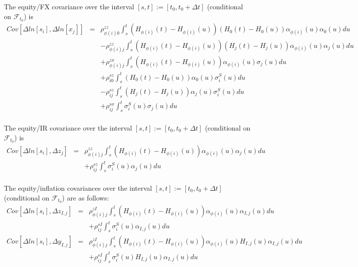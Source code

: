\documentclass[12pt, a4paper]{article}
\begin{document}
{{\begin{appendix}
The equity/FX covariance over the interval $[s,t] := [t_0, t_0+\Delta t]$ (conditional on $\mathcal{F}_{t_0}$) is
\begin{eqnarray*}
	Cov \left[\Delta ln[s_i], \Delta ln[x_j] \right] &=&
	\rho_{\phi(i)0}^{zz} \int_s^t (H_{\phi(i)} (t) - H_{\phi(i)} (u)) (H_0 (t) - H_0 (u)) \alpha_{\phi(i)}(u) 
	\alpha_0(u) 
	du\\
	&& - \rho_{\phi(i)j}^{zz} \int_s^t (H_{\phi(i)} (t) - H_{\phi(i)} (u)) (H_j (t) - H_j (u)) \alpha_{\phi(i)} 
	(u)\alpha_j(u) du\\
	&& + \rho_{\phi(i)j}^{zx} \int_s^t (H_{\phi(i)} (t) - H_{\phi(i)} (u)) \alpha_{\phi(i)} (u) \sigma_j(u) du\\
	&&+ \rho_{i0}^{sz} \int_s^t (H_0 (t) - H_0 (u)) \alpha_0 (u) \sigma_i^S(u) du\\
	&&- \rho_{ij}^{sz} \int_s^t (H_j (t) - H_j (u)) \alpha_j (u) \sigma_i^S(u) du\\
	&&+ \rho_{ij}^{sx} \int_s^t \sigma_i^S(u) \sigma_j(u) du\\
\end{eqnarray*}

The equity/IR covariance over the interval $[s,t] := [t_0, t_0+\Delta t]$ (conditional on $\mathcal{F}_{t_0}$) is
\begin{eqnarray*}
	Cov \left[\Delta ln[s_i], \Delta z_j \right] &=&
	\rho_{\phi(i)j}^{zz} \int_s^t (H_{\phi(i)} (t) - H_{\phi(i)} (u)) \alpha_{\phi(i)} (u) \alpha_j (u) du\\
	&&+ \rho_{ij}^{sz} \int_s^t \sigma_i^S (u) \alpha_j (u) du\\
\end{eqnarray*}

The equity/inflation covariances over the interval $[s,t] := [t_0, t_0+\Delta t]$ (conditional on $\mathcal{F}_{t_0}$) are as follows:
\begin{eqnarray*}
	Cov \left[\Delta ln[s_i], \Delta z_{I,j} \right] &=&
	\rho_{\phi(i)j}^{zI} \int_s^t (H_{\phi(i)} (t) - H_{\phi(i)} (u)) \alpha_{\phi(i)} (u) \alpha_{I,j} (u) du\\
	&&+ \rho_{ij}^{sI} \int_s^t \sigma_i^S (u) \alpha_{I,j} (u) du\\	
	Cov \left[\Delta ln[s_i], \Delta y_{I,j} \right] &=&
	\rho_{\phi(i)j}^{zI} \int_s^t (H_{\phi(i)} (t) - H_{\phi(i)} (u)) \alpha_{\phi(i)} (u) H_{I,j} (u) \alpha_{I,j} (u) du\\
	&&+ \rho_{ij}^{sI} \int_s^t \sigma_i^S (u) H_{I,j} (u) \alpha_{I,j} (u) du\\
\end{eqnarray*}


\end{appendix}}}
\end{document}

